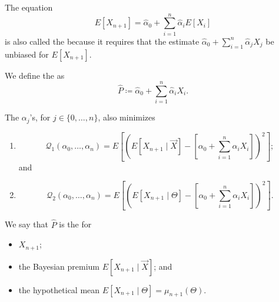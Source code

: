 \documentclass[notoc,notitlepage]{tufte-book}
\begin{document}
\begin{note}
  The equation
  \begin{equation*}
    E[X_{n+1}] = \hat{\alpha}_0 + \sum_{i=1}^{n} \hat{\alpha}_i E[X_i]
  \end{equation*}
  is also called the  because it requires that the
  estimate $\hat{\alpha}_0 + \sum_{i=1}^{n} \hat{\alpha}_j X_j$ be unbiased for
  $E[X_{n+1}]$.
\end{note}

\begin{defn}\label{defn:estimator_for_the_credibility_premium}
  We define the  as
  \begin{equation*}
    \hat{P} \coloneqq \hat{\alpha}_0 + \sum_{i=1}^{n} \hat{\alpha}_i X_i.
  \end{equation*}
\end{defn}

\begin{crly}\label{crly:p_hat_as_best_linear_estimator}
  The $\alpha_j$'s, for $j \in \{0, \ldots, n\}$, also minimizes
  \begin{enumerate}
    \item 
      \begin{equation*}
        \mathcal{Q}_1(\alpha_0, \ldots, \alpha_n) = E \left[ \left( E[X_{n+1}
          \mid \vec{X}] - \left[\alpha_0 + \sum_{i=1}^{n} \alpha_i X_i\right]
          \right)^2 \right];
      \end{equation*}
      and
    \item 
      \begin{equation*}
        \mathcal{Q}_2(\alpha_0, \ldots, \alpha_n) = E \left[ \left( E[X_{n+1}
          \mid \Theta] - \left[ \alpha_0 + \sum_{i=1}^{n} \alpha_i X_i \right]
          \right)^2 \right].
      \end{equation*}
  \end{enumerate}

  We say that $\hat{P}$ is the  for
  \begin{itemize}
    \item $X_{n+1}$;
    \item the Bayesian premium $E[X_{n+1} \mid \vec{X}]$; and
    \item the hypothetical mean $E[X_{n+1} \mid \Theta] = \mu_{n+1}(\Theta)$.
  \end{itemize}
\end{crly}
\end{document}
